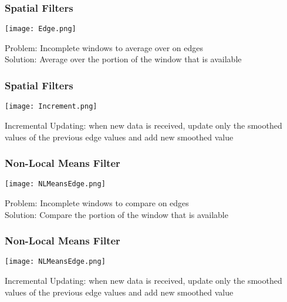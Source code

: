 \documentclass{beamer}
\begin{document}

\begin{frame}
\begin{center}
\frametitle{Spatial Filters}

\texttt{[image: Edge.png]}

Problem: Incomplete windows to average over on edges\\

$ $\\

Solution: Average over the portion of the window that is available

\end{center}
\end{frame}


\begin{frame}
\begin{center}
\frametitle{Spatial Filters}

\texttt{[image: Increment.png]}

Incremental Updating: when new data is received, update only the smoothed values of the previous edge values and add new smoothed value

\end{center}
\end{frame}


\begin{frame}
\begin{center}
\frametitle{Non-Local Means Filter}

\texttt{[image: NLMeansEdge.png]}

Problem: Incomplete windows to compare on edges\\

$ $\\

Solution: Compare the portion of the window that is available

\end{center}
\end{frame}


\begin{frame}
\begin{center}
\frametitle{Non-Local Means Filter}

\texttt{[image: NLMeansEdge.png]}

Incremental Updating: when new data is received, update only the smoothed values of the previous edge values and add new smoothed value

\end{center}
\end{frame}
\end{document}
